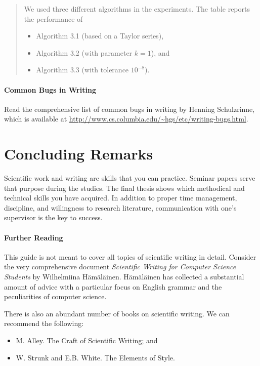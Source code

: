 \begin{quote}
  We used three different algorithms in the experiments. The table reports the performance of
\begin{itemize}
\item Algorithm 3.1 (based on a Taylor series),
\item Algorithm 3.2 (with parameter \(k = 1\)), and
\item Algorithm 3.3 (with tolerance \(10^{-8}\)).
\end{itemize}
\end{quote}

\paragraph{Common Bugs in Writing}
\label{par:commonbugs}
Read the comprehensive list of common bugs in writing by Henning Schulzrinne, which is available at \url{http://www.cs.columbia.edu/~hgs/etc/writing-bugs.html}.

\section{Concluding Remarks}

Scientific work and writing are skills that you can practice. Seminar papers serve that purpose during the studies. The final thesis shows which methodical and technical skills you have acquired. In addition to proper time management, discipline, and willingness to research literature, communication with one's supervisor is the key to success.

\paragraph{Further Reading}

This guide is not meant to cover all topics of scientific writing in detail. Consider the very comprehensive document \emph{Scientific Writing for Computer Science Students} by Wilhelmiina Hämäläinen.%
Hämäläinen has collected a substantial amount of advice with a particular focus on English grammar and the peculiarities of computer science.

There is also an abundant number of books on scientific writing. We can recommend the following:
\begin{itemize}
\item M. Alley. The Craft of Scientific Writing; and
\item W. Strunk and E.B. White. The Elements of Style.
\end{itemize}

